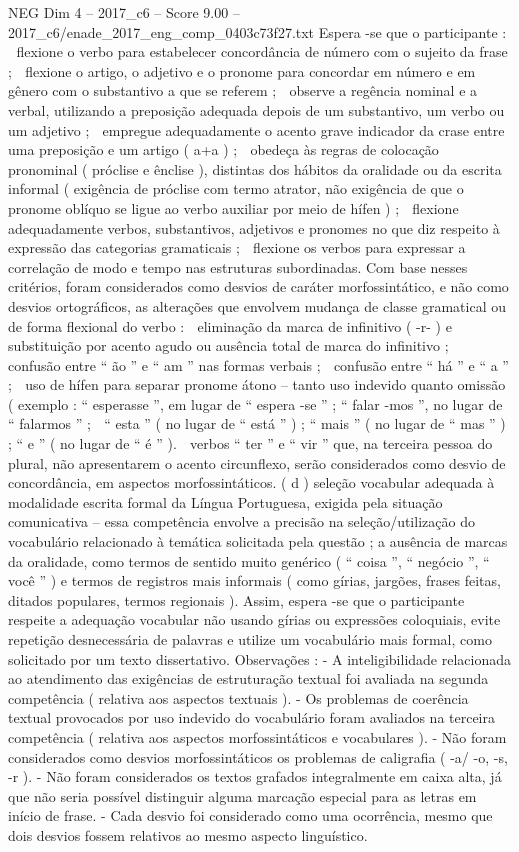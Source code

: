 \begin{textsample}{NEG Dim 4 – 2017\_c6 – Score 9.00 – 2017\_c6/enade\_2017\_eng\_comp\_0403c73f27.txt}
Espera -se que o participante :  flexione o verbo para estabelecer concordância de número com o sujeito da frase ;  flexione o artigo, o adjetivo e o pronome para concordar em número e em gênero com o substantivo a que se referem ;  observe a regência nominal e a verbal, utilizando a preposição adequada depois de um substantivo, um verbo ou um adjetivo ;  empregue adequadamente o acento grave indicador da crase entre uma preposição e um artigo ( a+a ) ;  obedeça às regras de colocação pronominal ( próclise e ênclise ), distintas dos hábitos da oralidade ou da escrita informal ( exigência de próclise com termo atrator, não exigência de que o pronome oblíquo se ligue ao verbo auxiliar por meio de hífen ) ;  flexione adequadamente verbos, substantivos, adjetivos e pronomes no que diz respeito à expressão das categorias gramaticais ;  flexione os verbos para expressar a correlação de modo e tempo nas estruturas subordinadas.
Com base nesses critérios, foram considerados como desvios de caráter morfossintático, e não como desvios ortográficos, as alterações que envolvem mudança de classe gramatical ou de forma flexional do verbo :  eliminação da marca de infinitivo ( -r- ) e substituição por acento agudo ou ausência total de marca do infinitivo ;  confusão entre “ ão ” e “ am ” nas formas verbais ;  confusão entre “ há ” e “ a ” ;  uso de hífen para separar pronome átono – tanto uso indevido quanto omissão ( exemplo : “ esperasse ”, em lugar de “ espera -se ” ; “ falar -mos ”, no lugar de “ falarmos ” ;  “ esta ” ( no lugar de “ está ” ) ; “ mais ” ( no lugar de “ mas ” ) ; “ e ” ( no lugar de “ é ” ).  verbos “ ter ” e “ vir ” que, na terceira pessoa do plural, não apresentarem o acento circunflexo, serão considerados como desvio de concordância, em aspectos morfossintáticos. ( d ) seleção vocabular adequada à modalidade escrita formal da Língua Portuguesa, exigida pela situação comunicativa – essa competência envolve a precisão na seleção/utilização do vocabulário relacionado à temática solicitada pela questão ; a ausência de marcas da oralidade, como termos de sentido muito genérico ( “ coisa ”, “ negócio ”, “ você ” ) e termos de registros mais informais ( como gírias, jargões, frases feitas, ditados populares, termos regionais ).
Assim, espera -se que o participante respeite a adequação vocabular não usando gírias ou expressões coloquiais, evite repetição desnecessária de palavras e utilize um vocabulário mais formal, como solicitado por um texto dissertativo.
Observações : - A inteligibilidade relacionada ao atendimento das exigências de estruturação textual foi avaliada na segunda competência ( relativa aos aspectos textuais ). - Os problemas de coerência textual provocados por uso indevido do vocabulário foram avaliados na terceira competência ( relativa aos aspectos morfossintáticos e vocabulares ). - Não foram considerados como desvios morfossintáticos os problemas de caligrafia ( -a/ -o, -s, -r ). - Não foram considerados os textos grafados integralmente em caixa alta, já que não seria possível distinguir alguma marcação especial para as letras em início de frase. - Cada desvio foi considerado como uma ocorrência, mesmo que dois desvios fossem relativos ao mesmo aspecto linguístico.

\end{textsample}
